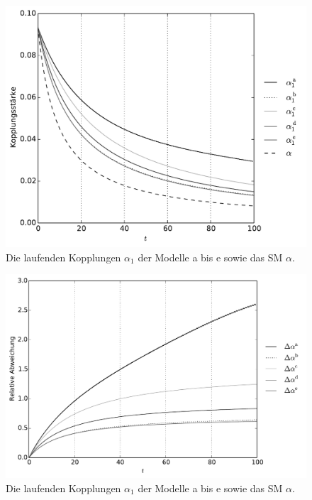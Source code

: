 \begin{figure}[h]
  \centering
  \includegraphics[scale=0.7]{Python/plots/alpha_running/Kopplungen1_her.pdf}
  \caption{Die laufenden Kopplungen $\alpha_1$ der Modelle a bis e sowie 
  das SM $\alpha$.}
  \label{fig:messbarkeit:alpha_running_afix2}
\end{figure}

\begin{figure}
  \centering
  \includegraphics[scale=0.7]{Python/plots/alpha_running/relative_deviation_her.pdf}
  \caption{Die laufenden Kopplungen $\alpha_1$ der Modelle a bis e sowie 
  das SM $\alpha$.}
  \label{fig:messbarkeit:relative_deviation}
\end{figure}
